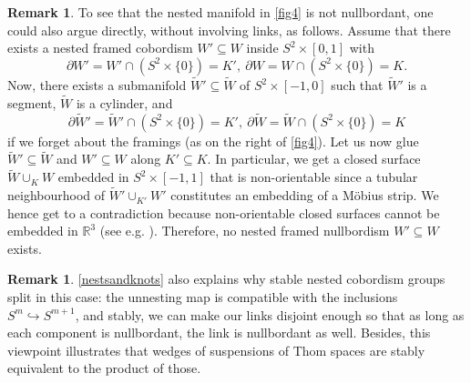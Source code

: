 \documentclass[a4paper, 11pt,reqno]{amsart}
\theoremstyle{plain}
\theoremstyle{definition}
\newtheorem{remark}[theorem]{Remark}
\begin{document}
\begin{remark}
To see that the nested manifold in \cref{fig4} is not nullbordant, one could also argue directly, without involving links, as follows. Assume that there exists a nested framed cobordism $W'\subseteq W$ inside $S^2\times[0,1]$ with
\[\partial W'=W'\cap(S^2\times\{0\})=K',\ \partial W=W\cap(S^2\times\{0\})=K.\]
Now, there exists a submanifold $\widetilde{W}'\subseteq \widetilde{W}$ of $S^2\times[-1,0]$ such that $\widetilde{W}'$ is a segment, $\widetilde{W}$ is a cylinder, and
\[ \partial \widetilde{W}'=\widetilde{W}'\cap(S^2\times\{0\})=K',\ \partial \widetilde{W}=\widetilde{W}\cap(S^2\times\{0\})=K\]
if we forget about the framings (as on the right of \cref{fig4}).
   Let us now glue $\widetilde{W}'\subseteq\widetilde{W}$ and $W'\subseteq W$ along $K'\subseteq K$.    
   In particular, we get a closed surface $\widetilde{W}\cup_{K}W$ embedded in $S^2\times[-1,1]$ that is non-orientable since a tubular neighbourhood of $\widetilde{W}'\cup_{K'}W'$ constitutes an embedding of a M\"{o}bius strip. We hence get to a contradiction because non-orientable closed surfaces cannot be embedded in $\mathbb{R}^3$ (see e.g. \cite{samelson}). Therefore, no nested framed nullbordism $W'\subseteq W$ exists. \par
\end{remark}
\begin{remark} \cref{nestsandknots} also explains why stable nested cobordism groups split in this case: the unnesting map is compatible with the inclusions $S^m\hookrightarrow S^{m+1}$, and stably, we can make our links disjoint enough so that as long as each component is nullbordant, the link is nullbordant as well. Besides, this viewpoint illustrates that wedges of suspensions of Thom spaces are stably equivalent to the product of those.
\end{remark}
\end{document}
